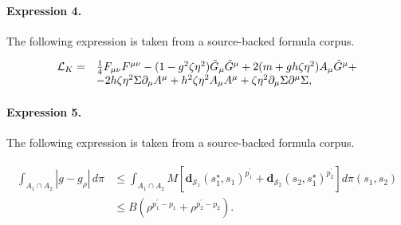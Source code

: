 \documentclass[11pt]{article}
\begin{document}
\paragraph{Expression 4.} The following expression is taken from a source-backed formula corpus.

\begin{align*}\begin{array}{ll}{\cal L}_K = &\frac{1}{4} F_{\mu \nu} F^{\mu \nu} -(1-g^2 \zeta \eta^2) \tilde G_{\mu} \tilde G^{\mu} +2(m + g h \zeta \eta^2) A_{\mu}\tilde G^{\mu} +\\&- 2h\zeta \eta^2 \Sigma \partial_{\mu} A^{\mu} + h^2 \zeta \eta^2 A_{\mu} A^{\mu} +\zeta \eta^2 \partial_{\mu} \Sigma \partial^{\mu} \Sigma , \end{array}\end{align*}

\paragraph{Expression 5.} The following expression is taken from a source-backed formula corpus.

\begin{align*}\begin{aligned}\int_{A_1 \cap A_2} |g - g_{\rho}| \, d \pi & \leq \int_{A_1 \cap A_2 } M \left[\boldsymbol{d}_{\mathcal{S}_1} (s^\star_1, s_1)^{p_1^{\prime}}+\boldsymbol{d}_{\mathcal{S}_2} (s_2, s^\star_1)^{p_2^{\prime}} \right] d\pi(s_1, s_2) \\& \leq B (\rho^{p_1^\prime - p_1 } + \rho^{ p_2^\prime - p_2} ).\end{aligned}\end{align*}
\end{document}
